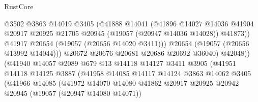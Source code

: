 \begin{lexlean}{RustCore}
\begin{coremodule}
                                      @3502
                                      @3863
                                      @14019
                                      @3405
                                      (@41888
                                        @14041
                                        (@41896
                                          @14027
                                          @14036
                                          @41904
                                          @20917
                                          @20925
                                          @21705
                                          @20945
                                          (@19057 (@20947 @14036 @14028))
                                          @41873))
                                      @41917
                                      @20654
                                      (@19057 (@20656 @14020 @3411)))
                                    @20654
                                    (@19057 (@20656 @13992 @14044)))
                                  @20672
                                  @20676
                                  @20681
                                  @20686
                                  @20692
                                  @36040)
                                @42048))
                            (@41940
                              @14057
                              @2089
                              @679
                              @13
                              @14118
                              @14127
                              @3411
                              @3905
                              (@41951
                                @14118
                                @14125
                                @3887
                                (@41958
                                  @14085
                                  @14117
                                  @14124
                                  @3863
                                  @14062
                                  @3405
                                  (@41966
                                    @14085
                                    (@41972
                                      @14070
                                      @14080
                                      @41862
                                      @20917
                                      @20925
                                      @20942
                                      @20945
                                      (@19057 (@20947 @14080 @14071))

\end{coremodule}
\end{lexlean}
